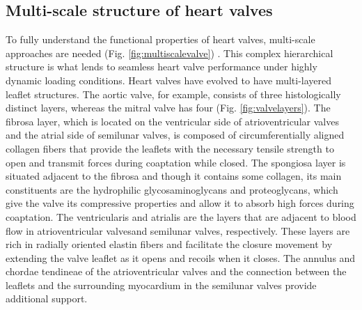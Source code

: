 \subsection{Multi-scale structure of heart valves}

    To fully understand the functional properties of heart valves, multi-scale approaches are needed (Fig. \ref{fig:multiscalevalve}) \cite{salma_heart_2016}. This complex hierarchical structure is what lends to seamless heart valve performance under highly dynamic loading conditions. Heart valves have evolved to have multi-layered leaflet structures. The aortic valve, for example, consists of three histologically distinct layers, whereas the mitral valve has four (Fig. \ref{fig:valvelayers}). The fibrosa layer, which is located on the ventricular side of atrioventricular valves and the atrial side of semilunar valves, is composed of circumferentially aligned collagen fibers that provide the leaflets with the necessary tensile strength to open and transmit forces during coaptation while closed. The spongiosa layer is situated adjacent to the fibrosa and though it contains some collagen, its main constituents are the hydrophilic glycosaminoglycans and proteoglycans, which give the valve its compressive properties and allow it to absorb high forces during coaptation. The ventricularis and atrialis are the layers that are adjacent to blood flow in atrioventricular valvesand semilunar valves, respectively. These layers are rich in radially oriented elastin fibers and facilitate the closure movement by extending the valve leaflet as it opens and recoils when it closes. The annulus and chordae tendineae of the atrioventricular valves and the connection between the leaflets and the surrounding myocardium in the semilunar valves provide additional support. 
    


